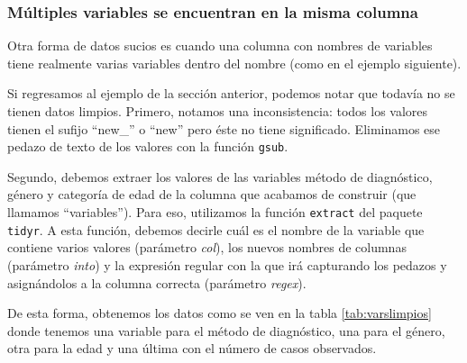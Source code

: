 \documentclass[]{article}
\newenvironment{Shaded}{\begin{snugshade}}{\end{snugshade}}
\newcommand{\KeywordTok}[1]{\textcolor[rgb]{0.13,0.29,0.53}{\textbf{{#1}}}}
\newcommand{\DataTypeTok}[1]{\textcolor[rgb]{0.13,0.29,0.53}{{#1}}}
\newcommand{\StringTok}[1]{\textcolor[rgb]{0.31,0.60,0.02}{{#1}}}
\newcommand{\NormalTok}[1]{{#1}}
\begin{document}
\subsubsection{Múltiples variables se encuentran en la misma
columna}\label{multiples-variables-se-encuentran-en-la-misma-columna}

Otra forma de datos sucios es cuando una columna con nombres de
variables tiene realmente varias variables dentro del nombre (como en el
ejemplo siguiente).

Si regresamos al ejemplo de la sección anterior, podemos notar que
todavía no se tienen datos limpios. Primero, notamos una inconsistencia:
todos los valores tienen el sufijo ``new\_'' o ``new'' pero éste no
tiene significado. Eliminamos ese pedazo de texto de los valores con la
función \texttt{gsub}.

Segundo, debemos extraer los valores de las variables método de
diagnóstico, género y categoría de edad de la columna que acabamos de
construir (que llamamos ``variables''). Para eso, utilizamos la función
\texttt{extract} del paquete \texttt{tidyr}. A esta función, debemos
decirle cuál es el nombre de la variable que contiene varios valores
(parámetro \emph{col}), los nuevos nombres de columnas (parámetro
\emph{into}) y la expresión regular con la que irá capturando los
pedazos y asignándolos a la columna correcta (parámetro \emph{regex}).

\begin{Shaded}
\end{Shaded}

De esta forma, obtenemos los datos como se ven en la tabla
\ref{tab:varslimpios} donde tenemos una variable para el método de
diagnóstico, una para el género, otra para la edad y una última con el
número de casos observados.
\end{document}
